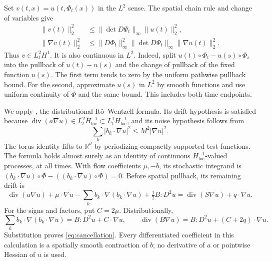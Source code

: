 \documentclass[11pt]{article}
\newcommand{\R}{\mathbb R}
\newcommand{\diver}{\operatorname{div}}
\begin{document}
Set $v(t,x)=u(t,\Phi_t(x))$ in the $L^2$ sense. The spatial chain rule
and change of variables give
\begin{align*}
 \|v(t)\|_2^2
 &\le\|\det D\Psi_t\|_\infty\|u(t)\|_2^2,\\
 \|\nabla v(t)\|_2^2
 &\le\|D\Phi_t\|_\infty^2\|\det D\Psi_t\|_\infty
       \|\nabla u(t)\|_2^2.
\end{align*}
Thus $v\in L^2_tH^1$. It is also continuous in $L^2$. Indeed, split
$u(t)\circ\Phi_t-u(s)\circ\Phi_s$ into the pullback of $u(t)-u(s)$
and the change of pullback of the fixed function $u(s)$. The first
term tends to zero by the uniform pathwise pullback bound. For the
second, approximate $u(s)$ in $L^2$ by smooth functions and use uniform
continuity of $\Phi$ and the same bound. This includes both time endpoints.

We apply \cite[Proposition 2.14]{ASV}, the distributional It\^o--Wentzell
formula. Its drift hypothesis is satisfied because
$\diver(a\nabla u)\in L^2_tH^{-1}_{\mathrm{loc}}\subset
L^1_tH^{-1}_{\mathrm{loc}}$, and its noise hypothesis follows from
\[
 \sum_k|b_k\cdot\nabla u|^2\le M^2|\nabla u|^2.
\]
The torus identity lifts to $\R^d$ by periodizing compactly supported
test functions. The formula holds almost surely as an identity of
continuous $H^{-1}_{\mathrm{loc}}$-valued processes, at all times.
With flow coefficients $\mu,-b$, its stochastic integrand is
$(b_k\cdot\nabla u)\circ\Phi-((b_k\cdot\nabla u)\circ\Phi)=0$.
Before spatial pullback, its remaining drift is
\begin{equation}\label{eq:cancellation}
 \diver(a\nabla u)+\mu\cdot\nabla u
 -\sum_k b_k\cdot\nabla(b_k\cdot\nabla u)
 +\tfrac12B:D^2u
 =\diver(S\nabla u)+q\cdot\nabla u.
\end{equation}
For the signs and factors, put $C=2\mu$. Distributionally,
\[
 \sum_kb_k\cdot\nabla(b_k\cdot\nabla u)=B:D^2u+C\cdot\nabla u,
 \qquad
 \diver(B\nabla u)=B:D^2u+(C+2q)\cdot\nabla u.
\]
Substitution proves \eqref{eq:cancellation}. Every differentiated
coefficient in this calculation is a spatially smooth contraction of
$b$; no derivative of $a$ or pointwise Hessian of $u$ is used.
\end{document}
